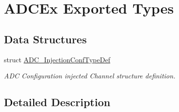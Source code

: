 \hypertarget{group___a_d_c_ex___exported___types}{}\section{A\+D\+C\+Ex Exported Types}
\label{group___a_d_c_ex___exported___types}
\subsection*{Data Structures}
\begin{DoxyCompactItemize}
\item 
struct \hyperlink{struct_a_d_c___injection_conf_type_def}{A\+D\+C\+\_\+\+Injection\+Conf\+Type\+Def}
\begin{DoxyCompactList}\small\item\em A\+DC Configuration injected Channel structure definition. \end{DoxyCompactList}\end{DoxyCompactItemize}


\subsection{Detailed Description}
